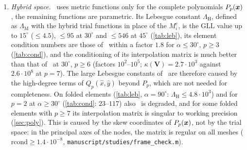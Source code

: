 \begin{enumerate}
  $\Lambda_{\mathrm M}=\max_{\bx\in\Omega^e}\sum\limits_{i}|M_i^e(\bx)|$ of the trial functions (basis independent;
  sampled at the images of a $16\times16$ grid of the reference element, so the values are lower
  bounds) equals the GLL value on affine elements, but grows by orders of magnitude for \PM\
  with $\alpha$ and $p$ (\cref{tab:leb}): $\Lambda_{\mathrm M}\le130$ for $\alpha=15^\circ$, $p\le6$, but
  $1.1\cdot10^3$ ($\alpha=30^\circ$, $p=4$), $5\cdot10^5$ ($45^\circ$, $p=5$) and $1.3\cdot10^8$ ($45^\circ$,
  $p=8$). The element condition numbers of \PM\ exceed those of \PP\ by similar factors
  (\cref{tab:cond}). The images of the GLL nodes of strongly non-affine elements come close to
  configurations that are not unisolvent for $Q_p$ in skew coordinates (``interpolation
  failure'' in \citep{Rajendran2010technique}); the metric trial functions then have large
  gradients, the bilinear form loses its stability constant, and round-off is amplified
  (\cref{sec:poly}). All cases of the benign regime of \cref{sec:conv} have
  $\Lambda_{\mathrm M}\le2.4\cdot10^2$, all degraded cases $\Lambda_{\mathrm M}\ge10^3$; the converse does not hold
  strictly ($\alpha=30^\circ$, $p=6$: $\Lambda_{\mathrm M}=6.2\cdot10^3$, yet \PM\ is $620$ times more accurate than
  \PP\ at $N=8$, smooth), so $\Lambda_{\mathrm M}$ is a necessary rather than a sufficient indicator.
\item \emph{Hybrid space.} \PH\ uses metric functions only for the complete polynomials
  $P_p(\bm{x})$, the remaining functions are parametric. Its Lebesgue constant $\Lambda_{\mathrm H}$, defined as
  $\Lambda_{\mathrm M}$ with the hybrid trial functions in place of the $M_i^e$, is the GLL value up
  to $15^\circ$ ($\le4.5$), $\le95$ at $30^\circ$ and $\le546$ at $45^\circ$ (\cref{tab:leb}), its
  element condition numbers are those of \PP\ within a factor $1.8$ for $\alpha\le30^\circ$, $p\ge3$
  (\cref{tab:cond}), and the conditioning of its interpolation matrix is much
  better than that of \PM\ at $30^\circ$, $p\ge6$ (factors $10^2$--$10^5$; $\kappa(\bm V)=2.7\cdot10^3$ against
  $2.6\cdot10^8$ at $p=7$). The large Lebesgue constants of \PM\ are therefore caused by the high-degree terms
  of $Q_p(\hat x,\hat y)$ beyond $P_p$, which are not needed for completeness. On folded
  elements (\cref{tab:leb}, $\alpha=90^\circ$: $\Lambda_{\mathrm H}\le4.8\cdot10^3$) and for $p=2$ at
  $\alpha\ge30^\circ$ (\cref{tab:cond}: $23$--$117$) also \PH\ is degraded, and for some folded
  elements with $p\ge7$ its interpolation matrix is singular to working precision (\cref{sec:poly}).
  This is caused by the skew coordinates of $P_p(\bm{x})$, not by the trial space: in the principal
  axes of the nodes, the matrix is regular on all meshes ($\mathrm{rcond}\ge1.4\cdot10^{-8}$,
  \texttt{manuscript/studies/frame\_check.m}).
\end{enumerate}

